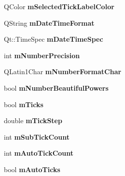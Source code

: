 \begin{DoxyCompactItemize}
\item 
Q\+Color {\bfseries m\+Selected\+Tick\+Label\+Color}\hypertarget{class_q_c_p_axis_a3bcad40902f45dc4c991a2c3e4d31d70}{}\label{class_q_c_p_axis_a3bcad40902f45dc4c991a2c3e4d31d70}

\item 
Q\+String {\bfseries m\+Date\+Time\+Format}\hypertarget{class_q_c_p_axis_a0b7ad83550d71daab4cfee2918e168e0}{}\label{class_q_c_p_axis_a0b7ad83550d71daab4cfee2918e168e0}

\item 
Qt\+::\+Time\+Spec {\bfseries m\+Date\+Time\+Spec}\hypertarget{class_q_c_p_axis_af73bec228c1a3203dc8aef1e84a46759}{}\label{class_q_c_p_axis_af73bec228c1a3203dc8aef1e84a46759}

\item 
int {\bfseries m\+Number\+Precision}\hypertarget{class_q_c_p_axis_acd76e8c783384d99ccc4a13797eec188}{}\label{class_q_c_p_axis_acd76e8c783384d99ccc4a13797eec188}

\item 
Q\+Latin1\+Char {\bfseries m\+Number\+Format\+Char}\hypertarget{class_q_c_p_axis_a39594313deef458f425bba25cd337a8a}{}\label{class_q_c_p_axis_a39594313deef458f425bba25cd337a8a}

\item 
bool {\bfseries m\+Number\+Beautiful\+Powers}\hypertarget{class_q_c_p_axis_af03809bee3f3e35fcc38d25b6dd5003b}{}\label{class_q_c_p_axis_af03809bee3f3e35fcc38d25b6dd5003b}

\item 
bool {\bfseries m\+Ticks}\hypertarget{class_q_c_p_axis_ab111e74bba22e06848897c932fc549fe}{}\label{class_q_c_p_axis_ab111e74bba22e06848897c932fc549fe}

\item 
double {\bfseries m\+Tick\+Step}\hypertarget{class_q_c_p_axis_a4fe96830fc5a2711e20fe5edccfe2ed3}{}\label{class_q_c_p_axis_a4fe96830fc5a2711e20fe5edccfe2ed3}

\item 
int {\bfseries m\+Sub\+Tick\+Count}\hypertarget{class_q_c_p_axis_ad70198e6ae2801fc409bc3caec707da9}{}\label{class_q_c_p_axis_ad70198e6ae2801fc409bc3caec707da9}

\item 
int {\bfseries m\+Auto\+Tick\+Count}\hypertarget{class_q_c_p_axis_a499fbb67111e4b204738f6c1aa28d842}{}\label{class_q_c_p_axis_a499fbb67111e4b204738f6c1aa28d842}

\item 
bool {\bfseries m\+Auto\+Ticks}\hypertarget{class_q_c_p_axis_aac23adcbae246bf165d4539ad65ac9f9}{}\label{class_q_c_p_axis_aac23adcbae246bf165d4539ad65ac9f9}


\end{DoxyCompactItemize}
